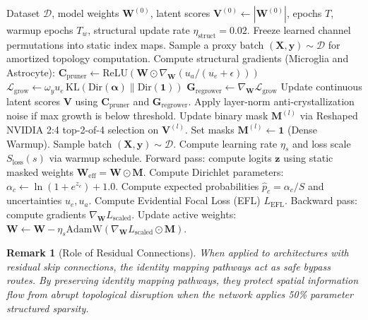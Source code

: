 \documentclass[letterpaper]{article} %
\newcommand{\Dir}{\text{Dir}}
\newcommand{\KL}{\text{KL}}
\newtheorem{remark}{Remark}
\begin{document}
\begin{algorithm}[t]
\caption{Universal GUDS-EDL Training and Optimization Loop}
\label{alg:guds_edl}
\begin{algorithmic}[1]
\REQUIRE Dataset $\mathcal{D}$, model weights $\bm{W}^{(0)}$, latent scores $\bm{V}^{(0)} \leftarrow |\bm{W}^{(0)}|$, epochs $T$, warmup epochs $T_w$, structural update rate $\eta_{\text{struct}} = 0.02$.
        \STATE Freeze learned channel permutations into static index maps.
    \ENDIF
        \STATE Sample a proxy batch $(\bm{X}, \bm{y}) \sim \mathcal{D}$ for amortized topology computation.
        \STATE Compute structural gradients (Microglia and Astrocyte):
        \STATE \quad $\bm{C}_{\text{pruner}} \leftarrow \text{ReLU}\left( \bm{W} \odot \nabla_{\bm{W}} (u_a / (u_e + \epsilon)) \right)$
        \STATE \quad $\mathcal{L}_{\text{grow}} \leftarrow \omega_y u_e\, \KL(\Dir(\bm{\alpha}) \parallel \Dir(\mathbf{1}))$
        \STATE \quad $\bm{G}_{\text{regrower}} \leftarrow \nabla_{\bm{W}} \mathcal{L}_{\text{grow}}$
        \STATE Update continuous latent scores $\bm{V}$ using $\bm{C}_{\text{pruner}}$ and $\bm{G}_{\text{regrower}}$.
        \STATE Apply layer-norm anti-crystallization noise if max growth is below threshold.
        \STATE Update binary mask $\bm{M}^{(l)}$ via Reshaped NVIDIA 2:4 top-2-of-4 selection on $\bm{V}^{(l)}$.
    \ELSE
        \STATE Set masks $\bm{M}^{(l)} \leftarrow \mathbf{1}$ (Dense Warmup).
    \ENDIF
        \STATE Sample batch $(\bm{X}, \bm{y}) \sim \mathcal{D}$.
        \STATE Compute learning rate $\eta_s$ and loss scale $S_{\text{loss}}(s)$ via warmup schedule.
        \STATE Forward pass: compute logits $\bm{z}$ using static masked weights $\bm{W}_{\text{eff}} = \bm{W} \odot \bm{M}$.
        \STATE Compute Dirichlet parameters: $\alpha_c \leftarrow \ln(1 + e^{z_c}) + 1.0$.
        \STATE Compute expected probabilities $\hat{p}_c = \alpha_c/S$ and uncertainties $u_e, u_a$.
        \STATE Compute Evidential Focal Loss (EFL) $L_{\text{EFL}}$.
        \STATE Backward pass: compute gradients $\nabla_{\bm{W}} L_{\text{scaled}}$.
        \STATE Update active weights: $\bm{W} \leftarrow \bm{W} - \eta_s \text{AdamW}(\nabla_{\bm{W}} L_{\text{scaled}} \odot \bm{M})$.
    \ENDFOR
\ENDFOR
\end{algorithmic}
\end{algorithm}

\begin{remark}[Role of Residual Connections]
When applied to architectures with residual skip connections, the identity mapping pathways act as safe bypass routes. By preserving identity mapping pathways, they protect spatial information flow from abrupt topological disruption when the network applies 50\% parameter structured sparsity.
\end{remark}
\end{document}
